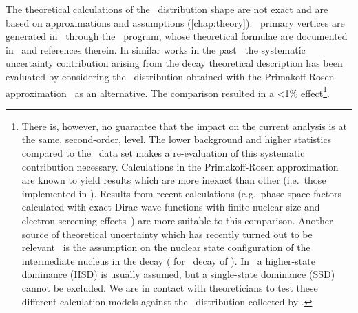 \begin{description}[wide]
  \item[Theoretical \nnbb\ decay model] The theoretical calculations of the \nnbb\
    distribution shape are not exact and are based on approximations and assumptions
    (\cref{chap:theory}).  \nnbb\ primary vertices are generated in \mage\ through the
    \decayzero\ program, whose theoretical formulae are documented
    in~\cite{Ponkratenko2000} and references therein. In similar works in the
    past~\cite{Agostini2015a, Agostini2013c} the systematic uncertainty contribution
    arising from the decay theoretical description has been evaluated by considering the
    \nnbb\ distribution obtained with the Primakoff-Rosen
    approximation~\cite{Primakoff1959} as an alternative. The comparison resulted in a
    <1\% effect\footnote{%
      There is, however, no guarantee that the impact on the current analysis is at the
      same, second-order, level. The lower background and higher statistics compared to
      the \phaseone\ data set makes a re-evaluation of this systematic contribution
      necessary. Calculations in the Primakoff-Rosen approximation are known to yield
      results which are more inexact than other (i.e.~those implemented in \decayzero).
      Results from recent calculations (e.g.~phase space factors calculated with exact
      Dirac wave functions with finite nuclear size and electron screening
      effects~\cite{Kotila2012}) are more suitable to this comparison.
      Another source of theoretical uncertainty which has recently turned out to be
      relevant~\cite{Arnold2019, Azzolini2019a} is the assumption on the nuclear state
      configuration of the intermediate nucleus in the decay (\nuc{As}{76} for \nnbb\
      decay of \gesix). In \gesix\ a higher-state dominance (HSD) is usually assumed, but
      a single-state dominance (SSD) cannot be excluded. We are in contact with
      theoreticians to test these different calculation models against the \nnbb\
      distribution collected by \gerda.
    }.


\end{description}
